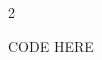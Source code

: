\documentclass[twoside]{article}
\begin{document}
\pagestyle{fancy}
\newpage

\selectfont
\color{coolgray}
\begin{multicols*}{2}
	\tableofcontents
\end{multicols*}


CODE HERE
\end{document}
